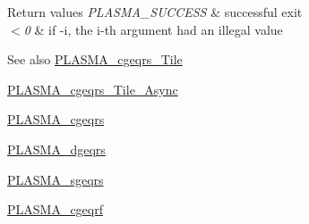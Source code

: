 \begin{DoxyRetVals}{Return values}
{\em P\+L\+A\+S\+M\+A\+\_\+\+S\+U\+C\+C\+E\+S\+S} & successful exit \\
\hline
{\em $<$0} & if -\/i, the i-\/th argument had an illegal value\\
\hline
\end{DoxyRetVals}
\begin{DoxySeeAlso}{See also}
\hyperlink{group__PLASMA__Complex32__t__Tile_gadaa2c4de5c15320cedb217e1087186c0_gadaa2c4de5c15320cedb217e1087186c0}{P\+L\+A\+S\+M\+A\+\_\+cgeqrs\+\_\+\+Tile} 

\hyperlink{group__PLASMA__Complex32__t__Tile__Async_gae06221bd74487f9617c819c4626f27ac_gae06221bd74487f9617c819c4626f27ac}{P\+L\+A\+S\+M\+A\+\_\+cgeqrs\+\_\+\+Tile\+\_\+\+Async} 

\hyperlink{group__PLASMA__Complex32__t_ga961a4dfc433c5086670b813e5fa53bbf_ga961a4dfc433c5086670b813e5fa53bbf}{P\+L\+A\+S\+M\+A\+\_\+cgeqrs} 

\hyperlink{group__double_gaa133b69ef592ef01466fd93b6ac7689d_gaa133b69ef592ef01466fd93b6ac7689d}{P\+L\+A\+S\+M\+A\+\_\+dgeqrs} 

\hyperlink{group__float_ga15cad3c163c8d1137d13d66594652b7d_ga15cad3c163c8d1137d13d66594652b7d}{P\+L\+A\+S\+M\+A\+\_\+sgeqrs} 

\hyperlink{group__PLASMA__Complex32__t_gae8490d9c587725716adbb347d85537b2_gae8490d9c587725716adbb347d85537b2}{P\+L\+A\+S\+M\+A\+\_\+cgeqrf} 
\end{DoxySeeAlso}
\hypertarget{group__PLASMA__Complex32__t_gafee4a25fd8dad584ec50f1718a319a8b_gafee4a25fd8dad584ec50f1718a319a8b}{}
